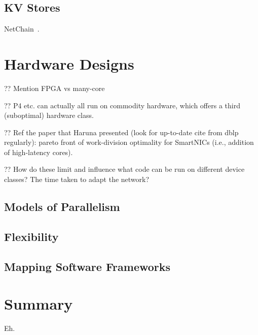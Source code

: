 \subsection{KV Stores}
NetChain~\parencite{DBLP:conf/nsdi/JinLZFLSKS18}.

\section{Hardware Designs}

?? Mention FPGA vs many-core

?? P4 etc. can actually all run on commodity hardware, which offers a third (suboptimal) hardware class.

?? Ref the paper that Haruna presented \parencite{haruna-rg-paper} (look for up-to-date cite from dblp regularly): pareto front of work-division optimality for SmartNICs (i.e., addition of high-latency cores).

?? How do these limit and influence what code can be run on different device classes? The time taken to adapt the network?

\subsection{Models of Parallelism}

\subsection{Flexibility}

\subsection{Mapping Software Frameworks}

\section{Summary}
Eh. 
